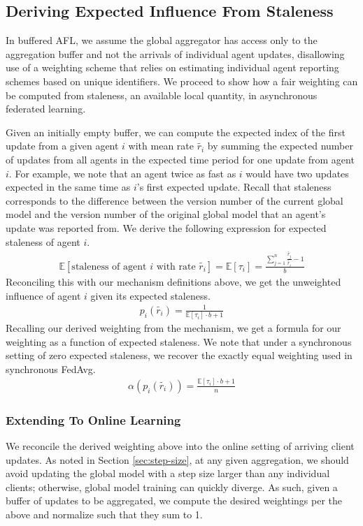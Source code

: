 \documentclass{article}
\begin{document}
\subsection{Deriving Expected Influence From Staleness}

In buffered AFL, we assume the global aggregator has access only to the aggregation buffer and not the arrivals of individual agent updates, disallowing use of a weighting scheme that relies on estimating individual agent reporting schemes based on unique identifiers. We proceed to show how a fair weighting can be computed from staleness, an available local quantity, in asynchronous federated learning.  

Given an initially empty buffer, we can compute the expected index of the first update from a given agent $i$ with mean rate $\tilde{r_i}$ by summing the expected number of updates from all agents in the expected time period for one update from agent $i$. For example, we note that an agent twice as fast as $i$ would have two updates expected in the same time as $i$'s first expected update. Recall that staleness corresponds to the difference between the version number of the current global model and the version number of the original global model that an agent's update was reported from. We derive the following expression for expected staleness of agent $i$.
\begin{gather}
    \mathbb{E}[\text{staleness of agent $i$ with rate $\tilde{r_i}$}] = \mathbb{E}[\tau_i] = \frac{\sum_{j=1}^n{\frac{\tilde{r_j}}{\tilde{r_i}}} - 1 }{b}
\end{gather}
Reconciling this with our mechanism definitions above, we get the unweighted influence of agent $i$ given its expected staleness.
\begin{gather}
    {p_i(\tilde{r_i})} = \frac{1}{\mathbb{E}[\tau_i] \cdot b + 1} 
\end{gather}
Recalling our derived weighting from the mechanism, we get a formula for our weighting as a function of expected staleness. We note that under a synchronous setting of zero expected staleness, we recover the exactly equal weighting used in synchronous FedAvg.
\begin{gather}
    \alpha(p_i(\tilde{r_i})) = \frac{\mathbb{E}[\tau_i] \cdot b + 1}{n}
\end{gather}

\subsubsection{Extending To Online Learning} \label{sec:online-learning}
We reconcile the derived weighting above into the online setting of arriving client updates. As noted in Section \ref{sec:step-size}, at any given aggregation, we should avoid updating the global model with a step size larger than any individual clients; otherwise, global model training can quickly diverge. As such, given a buffer of updates to be aggregated, we compute the desired weightings per the above and normalize such that they sum to 1.
\end{document}
